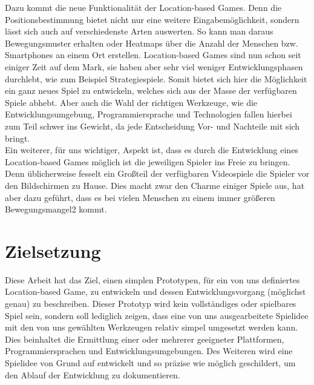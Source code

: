 Dazu kommt die neue Funktionalität der Location-based Games. Denn die Positionsbestimmung bietet nicht nur eine weitere Eingabemöglichkeit, sondern lässt sich auch auf verschiedenste Arten auswerten. So kann man daraus Bewegungsmuster erhalten oder Heatmaps über die Anzahl der Menschen bzw. Smartphones an einem Ort erstellen. Location-based Games sind nun schon seit einiger Zeit auf dem Mark, sie haben aber sehr viel weniger Entwicklungsphasen durchlebt, wie zum Beispiel Strategiespiele. Somit bietet sich hier die Möglichkeit ein ganz neues Spiel zu entwickeln, welches sich aus der Masse der verfügbaren Spiele abhebt.
Aber auch die Wahl der richtigen Werkzeuge, wie die Entwicklungsumgebung, Programmiersprache und Technologien fallen hierbei zum Teil schwer ins Gewicht, da jede Entscheidung Vor- und Nachteile mit sich bringt. \\
Ein weiterer, für uns wichtiger, Aspekt ist,  dass es durch die Entwicklung eines Location-based Games möglich ist die jeweiligen Spieler ins Freie zu bringen. Denn üblicherweise fesselt ein Großteil der verfügbaren Videospiele die Spieler vor den Bildschirmen zu Hause. Dies macht zwar den Charme einiger Spiele aus, hat aber dazu geführt, dass es bei vielen Menschen zu einem immer größeren Bewegungsmangel2 kommt. 

\section{Zielsetzung}
\label{sec:zielsetzung}
Diese Arbeit hat das Ziel, einen simplen Prototypen, für ein von uns definiertes  Location-based Game, zu entwickeln und dessen Entwicklungsvorgang (möglichst genau) zu beschreiben. Dieser Prototyp wird kein vollständiges oder spielbares Spiel sein, sondern soll lediglich zeigen, dass eine von uns ausgearbeitete Spielidee mit den von uns gewählten Werkzeugen relativ simpel umgesetzt werden kann. Dies beinhaltet die Ermittlung einer oder mehrerer geeigneter Plattformen, Programmiersprachen und Entwicklungsumgebungen. Des Weiteren wird eine Spielidee von Grund auf entwickelt und so präzise wie möglich geschildert, um den Ablauf der Entwicklung  zu dokumentieren.
